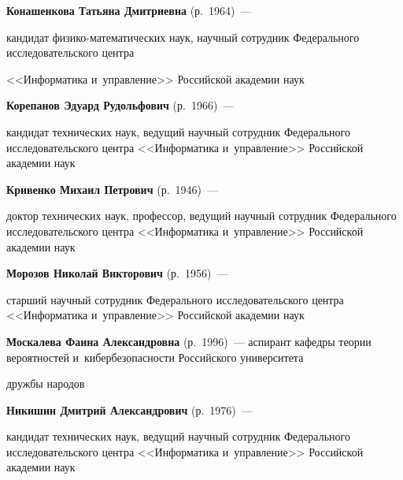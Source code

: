 \textbf{Конашенкова Татьяна Дмитриевна} (р.\ 1964)~--- 


кандидат фи\-зи\-ко-ма\-те\-ма\-ти\-че\-ских наук, научный сотрудник Федерального исследовательского цент\-ра 


<<Информатика и~управ\-ле\-ние>> Российской академии наук





\noindent


\textbf{Корепанов Эдуард Рудольфович} (р.\ 1966)~--- 


кандидат технических наук, ведущий научный сотрудник Федерального исследовательского цент\-ра <<Информатика и~управ\-ле\-ние>> Российской академии наук











\noindent


\textbf{Кривенко Михаил Петрович} (р.\ 1946)~--- 


доктор технических наук, профессор, ведущий научный со\-труд\-ник Федерального исследовательского цент\-ра <<Информатика и~управ\-ле\-ние>> Российской академии наук





\noindent


\textbf{Морозов Николай Викторович} (р.\ 1956)~--- 


старший научный сотрудник Федерального исследовательского цент\-ра <<Информатика и~управ\-ле\-ние>> Российской академии наук





\noindent


\textbf{Москалева Фаина Александровна} (р.\ 1996)~--- аспирант ка\-фед\-ры тео\-рии вероятностей и~ки\-бер\-безопас\-ности Российского университета 


друж\-бы народов





\noindent


\textbf{Никишин Дмитрий Александрович} (р.\ 1976)~--- 


кандидат технических наук, ведущий научный сотрудник Федерального исследовательского цент\-ра <<Информатика и~управ\-ле\-ние>> Российской академии наук





